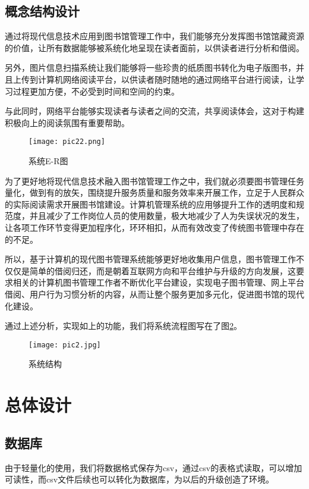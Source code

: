 \documentclass[forprint]{shmtu}
\begin{document}
\section{概念结构设计}

通过将现代信息技术应用到图书馆管理工作中，我们能够充分发挥图书馆馆藏资源的价值，让所有数据能够被系统化地呈现在读者面前，以供读者进行分析和借阅。

另外，图片信息扫描系统让我们能够将一些珍贵的纸质图书转化为电子版图书，并且上传到计算机网络阅读平台，以供读者随时随地的通过网络平台进行阅读，让学习过程更加方便，不必受到时间和空间的约束。

与此同时，网络平台能够实现读者与读者之间的交流，共享阅读体会，这对于构建积极向上的阅读氛围有重要帮助。

\begin{figure}[!htbp]
	\centering
	\texttt{[image: pic22.png]}
	\caption{系统E-R图}
	\label{pic:22}
\end{figure}

为了更好地将现代信息技术融入图书馆管理工作之中，我们就必须要图书管理任务量化，做到有的放矢，围绕提升服务质量和服务效率来开展工作，立足于人民群众的实际阅读需求开展图书馆建设。计算机管理系统的应用够提升工作的透明度和规范度，并且减少了工作岗位人员的使用数量，极大地减少了人为失误状况的发生，让各项工作环节变得更加程序化，环环相扣，从而有效改变了传统图书管理中存在的不足。

所以，基于计算机的现代图书管理系统能够更好地收集用户信息，图书管理工作不仅仅是简单的借阅归还，而是朝着互联网方向和平台维护与升级的方向发展，这要求相关的计算机图书管理工作者不断优化平台建设，实现电子图书管理、网上平台借阅、用户行为习惯分析的内容，从而让整个服务更加多元化，促进图书馆的现代化建设。

通过上述分析，实现如上的功能，我们将系统流程图写在了图\ref{pic:2}。 
\begin{figure}[!htbp]
	\centering
	\texttt{[image: pic2.jpg]}
	\caption{系统结构}
	\label{pic:2}
\end{figure}



\chapter{总体设计}

\section{数据库}

由于轻量化的使用，我们将数据格式保存为csv，通过csv的表格式读取，可以增加可读性，而csv文件后续也可以转化为数据库，为以后的升级创造了环境。
\end{document}

